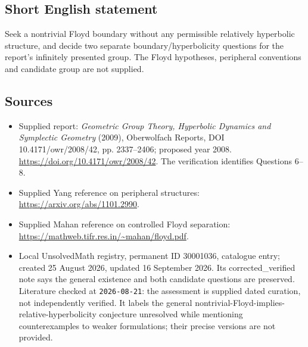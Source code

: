 \documentclass[11pt]{article}
\begin{document}
\subsection{Short English statement}
Seek a nontrivial Floyd boundary without any permissible relatively hyperbolic structure, and decide two separate boundary/hyperbolicity questions for the report's infinitely presented group. The Floyd hypotheses, peripheral conventions and candidate group are not supplied.
\subsection{Sources}
\begin{itemize}
\item Supplied report: \emph{Geometric Group Theory, Hyperbolic Dynamics and Symplectic Geometry} (2009), Oberwolfach Reports, DOI 10.4171/owr/2008/42, pp. 2337--2406; proposed year 2008. \url{https://doi.org/10.4171/owr/2008/42}. The verification identifies Questions 6--8.
\item Supplied Yang reference on peripheral structures: \url{https://arxiv.org/abs/1101.2990}.
\item Supplied Mahan reference on controlled Floyd separation: \url{https://mathweb.tifr.res.in/~mahan/floyd.pdf}.
\item Local UnsolvedMath registry, permanent ID 30001036, catalogue entry; created 25 August 2026, updated 16 September 2026. Its corrected\_verified note says the general existence and both candidate questions are preserved. Literature checked at \texttt{2026-08-21}: the assessment is supplied dated curation, not independently verified. It labels the general nontrivial-Floyd-implies-relative-hyperbolicity conjecture unresolved while mentioning counterexamples to weaker formulations; their precise versions are not provided.
\end{itemize}
\end{document}
